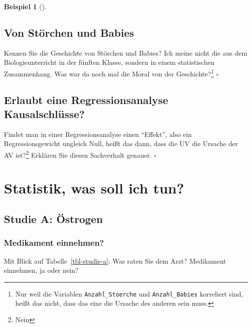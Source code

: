 \documentclass[
  ngerman,
  letterpaper,
  twoside,
  open=any]{scrbook}
\theoremstyle{definition}
\newtheorem{example}{Beispiel}[chapter]
\theoremstyle{plain}
\theoremstyle{definition}
\theoremstyle{definition}
\theoremstyle{remark}
\begin{document}
\begin{example}[]
\subsection{Von Störchen und Babies}\label{von-stuxf6rchen-und-babies}

Kennen Sie die Geschichte von Störchen und Babies? Ich meine nicht die
aus dem Biologieunterricht in der fünften Klasse, sondern in einem
statistischen Zusammenhang. Was war da noch mal die Moral von der
Geschichte?\footnote{Nur weil die Variablen \texttt{Anzahl\_Stoerche}
  und \texttt{Anzahl\_Babies} korreliert sind, heißt das nicht, dass das
  eine die Ursache des anderen sein muss.} \(\square\)

\subsection{Erlaubt eine Regressionsanalyse
Kausalschlüsse?}\label{erlaubt-eine-regressionsanalyse-kausalschluxfcsse}

Findet man in einer Regressionsanalyse einen \enquote{Effekt}, also ein
Regressionsgewicht ungleich Null, heißt das dann, dass die UV die
Ursache der AV ist?\footnote{Nein} Erklären Sie diesen Sachverhalt
genauer. \(\square\)

\section{Statistik, was soll ich tun?}\label{statistik-was-soll-ich-tun}

\subsection{Studie A: Östrogen}\label{studie-a-uxf6strogen-1}

\subsubsection{Medikament einnehmen?}\label{medikament-einnehmen}

Mit Blick auf Tabelle~\ref{tbl-studie-a}: Was raten Sie dem Arzt?
Medikament einnehmen, ja oder nein?

\begin{table}

\caption{\label{tbl-studie-a}Daten zur Studie A}

\end{table}
\end{example}
\end{document}
